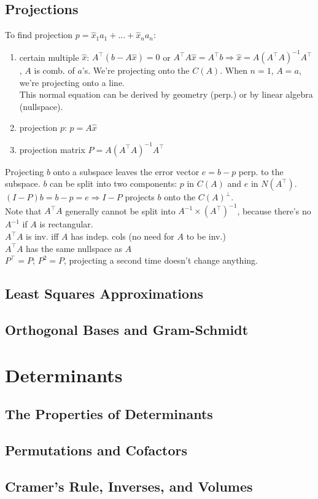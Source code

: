 \documentclass{report}
\begin{document}
\section{Projections}
To find projection $p = \hat{x}_1 a_1 + \dots + \hat{x}_n a_n$: 
\begin{enumerate}
    \item certain multiple $\hat{x}$: $A^\top (b - A\hat{x}) = 0$ or $A^\top A\hat{x} = A^\top b \Rightarrow 
    \hat{x} = A(A^\top A)^{-1} A^\top$, $A$ is comb. of $a$'s. We're projecting onto the $C(A)$. When $n = 1$,  
    $A = a$, we're projecting onto a line. \\
    This normal equation can be derived by geometry (perp.) or by linear algebra (nullspace).
    \item projection $p$: $p = A \hat{x}$ 
    \item projection matrix $P = A(A^\top A)^{-1} A^\top$
\end{enumerate}
Projecting $b$ onto a subspace leaves the error vector $e = b - p$ perp. to the subspace. 
$b$ can be split into two components: $p$ in $C(A)$ and $e$ in $N(A^\top)$. \\
$(I - P)b = b - p = e \Rightarrow I-P$ projects $b$ onto the $C(A)^\perp$. \\
Note that $A^\top A$ generally cannot be split into $A^{-1} \times (A^\top)^{-1}$, because there's no $A^{-1}$ 
if $A$ is rectangular. \\
$A^\top A$ is inv. iff $A$ has indep. cols (no need for $A$ to be inv.) \\
$A^\top A$ has the same nullspace as $A$ \\
$P^\top = P$; $P^2 = P$, projecting a second time doesn't change anything. \\

\section{Least Squares Approximations}

\section{Orthogonal Bases and Gram-Schmidt}

\chapter{Determinants}
\section{The Properties of Determinants}

\section{Permutations and Cofactors}

\section{Cramer's Rule, Inverses, and Volumes}
\end{document}
